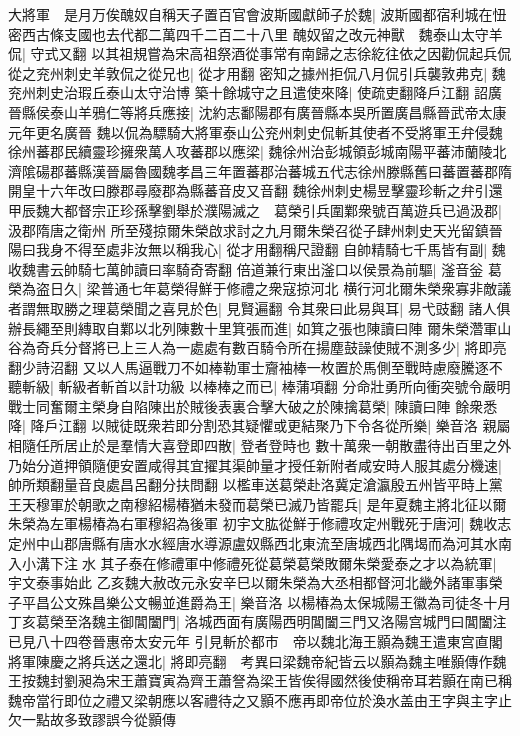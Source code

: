 大將軍　是月万俟醜奴自稱天子置百官會波斯國獻師子於魏|{
	波斯國都宿利城在忸密西古條支國也去代都二萬四千二百二十八里}
醜奴留之改元神獸　魏泰山太守羊侃|{
	守式又翻}
以其祖規嘗為宋高祖祭酒從事常有南歸之志徐紇往依之因勸侃起兵侃從之兖州刺史羊敦侃之從兄也|{
	從才用翻}
密知之據州拒侃八月侃引兵襲敦弗克|{
	魏兖州刺史治瑕丘泰山太守治博}
築十餘城守之且遣使來降|{
	使疏吏翻降戶江翻}
詔廣晉縣侯泰山羊鴉仁等將兵應接|{
	沈約志鄱陽郡有廣晉縣本吳所置廣昌縣晉武帝太康元年更名廣晉}
魏以侃為驃騎大將軍泰山公兖州刺史侃斬其使者不受將軍王弁侵魏徐州蕃郡民續靈珍擁衆萬人攻蕃郡以應梁|{
	魏徐州治彭城領彭城南陽平蕃沛蘭陵北濟隂碭郡蕃縣漢晉屬魯國魏孝昌三年置蕃郡治蕃城五代志徐州滕縣舊曰蕃置蕃郡隋開皇十六年改曰滕郡尋廢郡為縣蕃音皮又音翻}
魏徐州刺史楊昱擊靈珍斬之弁引還　甲辰魏大都督宗正珍孫擊劉舉於濮陽滅之　葛榮引兵圍鄴衆號百萬遊兵已過汲郡|{
	汲郡隋唐之衛州}
所至殘掠爾朱榮啟求討之九月爾朱榮召從子肆州刺史天光留鎮晉陽曰我身不得至處非汝無以稱我心|{
	從才用翻稱尺證翻}
自帥精騎七千馬皆有副|{
	魏收魏書云帥騎七萬帥讀曰率騎奇寄翻}
倍道兼行東出滏口以侯景為前驅|{
	滏音釡}
葛榮為盗日久|{
	梁普通七年葛榮得鮮于修禮之衆寇掠河北}
横行河北爾朱榮衆寡非敵議者謂無取勝之理葛榮聞之喜見於色|{
	見賢遍翻}
令其衆曰此易與耳|{
	易弋豉翻}
諸人俱辦長繩至則縳取自鄴以北列陳數十里箕張而進|{
	如箕之張也陳讀曰陣}
爾朱榮濳軍山谷為奇兵分督將已上三人為一處處有數百騎令所在揚塵鼓譟使賊不測多少|{
	將即亮翻少詩沼翻}
又以人馬逼戰刀不如棒勒軍士齎袖棒一枚置於馬側至戰時慮廢騰逐不聽斬級|{
	斬級者斬首以計功級}
以棒棒之而已|{
	棒蒲項翻}
分命壯勇所向衝突號令嚴明戰士同奮爾主榮身自陷陳出於賊後表裏合擊大破之於陳擒葛榮|{
	陳讀曰陣}
餘衆悉降|{
	降戶江翻}
以賊徒既衆若即分割恐其疑懼或更結聚乃下令各從所樂|{
	樂音洛}
親屬相隨任所居止於是羣情大喜登即四散|{
	登者登時也}
數十萬衆一朝散盡待出百里之外乃始分道押領隨便安置咸得其宜擢其渠帥量才授任新附者咸安時人服其處分機速|{
	帥所類翻量音良處昌呂翻分扶問翻}
以檻車送葛榮赴洛冀定滄瀛殷五州皆平時上黨王天穆軍於朝歌之南穆紹楊椿猶未發而葛榮已滅乃皆罷兵|{
	是年夏魏主將北征以爾朱榮為左軍楊椿為右軍穆紹為後軍}
初宇文肱從鮮于修禮攻定州戰死于唐河|{
	魏收志定州中山郡唐縣有唐水水經唐水導源盧奴縣西北東流至唐城西北隅堨而為河其水南入小溝下注水}
其子泰在修禮軍中修禮死從葛榮葛榮敗爾朱榮愛泰之才以為統軍|{
	宇文泰事始此}
乙亥魏大赦改元永安辛巳以爾朱榮為大丞相都督河北畿外諸軍事榮子平昌公文殊昌樂公文暢並進爵為王|{
	樂音洛}
以楊椿為太保城陽王徽為司徒冬十月丁亥葛榮至洛魏主御閶闔門|{
	洛城西面有廣陽西明閶闔三門又洛陽宫城門曰閶闔注已見八十四卷晉惠帝太安元年}
引見斬於都市　帝以魏北海王顥為魏王遣東宫直閣將軍陳慶之將兵送之還北|{
	將即亮翻　考異曰梁魏帝紀皆云以顥為魏主唯顥傳作魏王按魏封劉昶為宋王蕭寶寅為齊王蕭詧為梁王皆俟得國然後使稱帝耳若顥在南已稱魏帝當行即位之禮又梁朝應以客禮待之又顥不應再即帝位於渙水盖由王字與主字止欠一點故多致謬誤今從顥傳}
